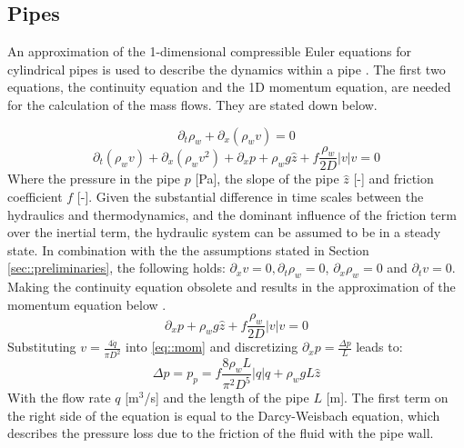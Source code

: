 


\subsection{Pipes}\label{sec::hydropipes}
An approximation of the 1-dimensional compressible Euler equations for cylindrical pipes is used to describe the dynamics within a pipe \cite{Krug2020}. The first two equations, the continuity equation and the 1D momentum equation, are needed for the calculation of the mass flows. They are stated down below.

\begin{equation}
\partial_t \rho_w+\partial_x\left(\rho_w v\right)=0
\end{equation}
\begin{equation}
\partial_t (\rho_w v)+\partial_x(\rho_w v^2)+ \partial_x p+\rho_w g \hat{z}  +f \frac{\rho_w}{2 D}|v| v=0
\end{equation}
Where the pressure in the pipe $p$ [Pa], the slope of the pipe $\hat{z}$ [-] and friction coefficient $f$ [-]. Given the substantial difference in time scales between the hydraulics and thermodynamics, and the dominant influence of the friction term over the inertial term, the hydraulic system can be assumed to be in a steady state. In combination with the the assumptions stated in Section \ref{sec::preliminaries}, the following holds: $\partial_x v = 0, \partial_t \rho_w = 0$, $\partial_x \rho_w = 0$ and $\partial_t v = 0$. Making the continuity equation obsolete and results in the approximation of the momentum equation below \cite{sibeijn2025economic}. 
\begin{equation}\label{eq::mom}
\partial_x p + \rho_w g \hat{z} +f \frac{\rho_w}{2 D}\left|v\right| v=0
\end{equation}
Substituting $v = \frac{4 \dot{q}}{\pi D^2}$ into \eqref{eq::mom} and discretizing $\partial_x p = \frac{\Delta p}{L}$ leads to:
\begin{equation}
    \Delta p = p_{p} =  f \frac{8\rho_w L}{\pi^2 D^5}\left|q\right| q + \rho_w g L \hat{z}
\end{equation}
With the flow rate $q$ [m$^3$/s] and the length of the pipe $L$ [m]. The first term on the right side of the equation is equal to the Darcy-Weisbach equation, which describes the pressure loss due to the friction of the fluid with the pipe wall.  

